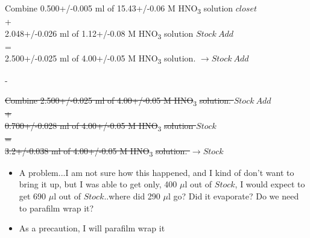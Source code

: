 \documentclass[idxtotoc,hyperref,openany,oneside]{labbook} %
\newcommand{\tsbs}{\textsubscript}
\begin{document}
\begin{center}
Combine 0.500+/-0.005 ml of 15.43+/-0.06 M HNO\tsbs{3}
solution $\boxed{closet}$\\
+\\
2.048+/-0.026 ml of 1.12+/-0.08 M HNO\tsbs{3} solution
$\boxed{Stock\ Add}$
\\
=\\
2.500+/-0.025 ml of 4.00+/-0.05 M HNO\tsbs{3} solution.
$\boxed{\rightarrow Stock\ Add}$
\end{center}
\begin{todolist}
\item{-}
\end{todolist}
\begin{center}
\st{Combine 2.500+/-0.025 ml of 4.00+/-0.05 M HNO}\tsbs{3}\st{ solution.
$\boxed{Stock\ Add}$}\\
\st{+}\\
\st{0.700+/-0.028 ml of 4.00+/-0.05 M HNO}\tsbs{3}\st{ solution
$\boxed{Stock}$}
\\
\st{=}\\
\st{3.2+/-0.038 ml of 4.00+/-0.05 M HNO}\tsbs{3}\st{ solution.
  $\boxed{\rightarrow Stock}$}
\begin{itemize}
\item{A problem...I am not sure how this happened, and I kind of
  don't want to bring it up, but I was able to get only,
  400 $\mu$l out of $\boxed{Stock}$, I would expect to get
  690 $\mu$l out of $\boxed{Stock}$..where did 290 $\mu$l go?
  Did it evaporate? Do we need to parafilm wrap it?}
\item{As a precaution, I will parafilm wrap it}
\end{itemize}
\end{center}
\end{document}
